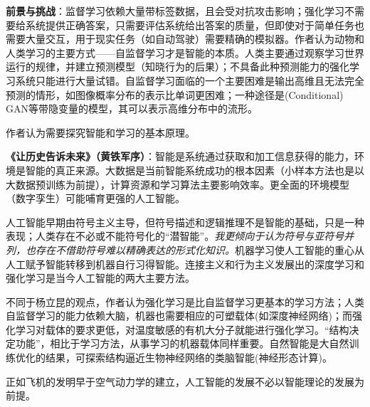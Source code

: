 \par \textbf{前景与挑战}：监督学习依赖大量带标签数据，且会受对抗攻击影响；强化学习不需要给系统提供正确答案，只需要评估系统给出答案的质量，但即使对于简单任务也需要大量交互，用于现实任务（如自动驾驶）需要精确的模拟器。作者认为动物和人类学习的主要方式——自监督学习才是智能的本质。人类主要通过观察学习世界运行的规律，并建立预测模型（知晓行为的后果）；不具备此种预测能力的强化学习系统只能进行大量试错。自监督学习面临的一个主要困难是输出高维且无法完全预测的情形，如图像概率分布的表示比单词更困难；一种途径是(Conditional) GAN等带隐变量的模型，其可以表示高维分布中的流形。

\par 作者认为需要探究智能和学习的基本原理。



\par \textbf{《让历史告诉未来》（黄铁军序）}：智能是系统通过获取和加工信息获得的能力，环境是智能的真正来源。大数据是当前智能系统成功的根本因素（小样本方法也是以大数据预训练为前提），计算资源和学习算法主要影响效率。更全面的环境模型（数字孪生）可能哺育更强的人工智能。
\par 人工智能早期由符号主义主导，但符号描述和逻辑推理不是智能的基础，只是一种表现；人类存在不必或不能符号化的“潜智能”。\emph{我更倾向于认为符号与亚符号并列，也存在不借助符号难以精确表达的形式化知识。}机器学习使人工智能的重心从人工赋予智能转移到机器自行习得智能。连接主义和行为主义发展出的深度学习和强化学习是当今人工智能的两大主要方法。
\par 不同于杨立昆的观点，作者认为强化学习是比自监督学习更基本的学习方法；人类自监督学习的能力依赖大脑，机器也需要相应的可塑载体(如深度神经网络)；而强化学习对载体的要求更低，对温度敏感的有机大分子就能进行强化学习。“结构决定功能”，相比于学习方法，从事学习的机器载体同样重要。自然智能是大自然训练优化的结果，可探索结构逼近生物神经网络的类脑智能(神经形态计算)。
\par 正如飞机的发明早于空气动力学的建立，人工智能的发展不必以智能理论的发展为前提。